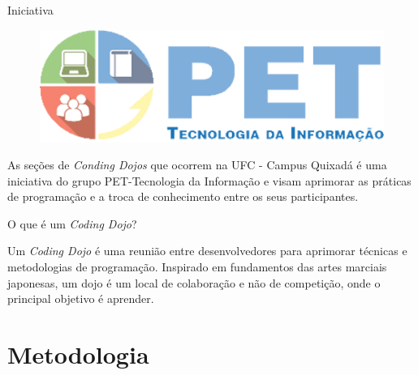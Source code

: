 \documentclass[10pt]{beamer}
\begin{document}
\begin{frame}{Iniciativa}
\begin{figure}[H]
\begin{minipage}[b]{0.1\textwidth}
  \end{minipage}
  \hfill
  \begin{minipage}[b]{0.3\textwidth}
    \includegraphics[width=\textwidth]{figuras/petti.png}
  \end{minipage}
  \hfill
  \begin{minipage}[b]{0.25\textwidth}\end{minipage}
\end{figure}

As se\c{c}\~oes de \textit{Conding Dojos} que ocorrem na UFC - Campus Quixad\'a \'e uma iniciativa do grupo PET-Tecnologia da Informação 
e visam aprimorar as práticas de programação e a troca de conhecimento entre os seus participantes.

\end{frame}

\begin{frame}{O que \'e um \textit{Coding Dojo}?}

Um \textit{Coding Dojo} é uma reunião entre desenvolvedores para aprimorar técnicas e metodologias de programação. Inspirado em fundamentos 
das artes marciais japonesas, um dojo é um local de colaboração e não de competição, onde o principal objetivo é aprender.

\end{frame}


\section{Metodologia}
\end{document}
